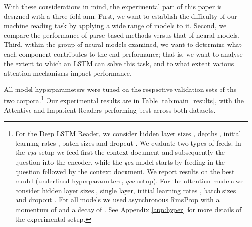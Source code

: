 \documentclass{article}
\begin{document}
With these considerations in mind, the experimental part of this paper is
designed with a three-fold aim. First, we want to establish the difficulty of our
machine reading task by applying a wide range of models to it. Second, we compare
the performance of parse-based methods versus that of neural models. Third,
within the group of neural models examined, we want to determine what each
component contributes to the end performance; that is, we want to analyse the
extent to which an LSTM can solve this task, and to what extent various
attention mechanisms impact performance.

\newcommand{\ee}[1][]{\text{\sc{e}#1}}

 All model hyperparameters were tuned on the respective validation sets of the
 two corpora.\footnote{For the Deep LSTM Reader, we consider hidden layer sizes
   , depths , initial
   learning rates , batch
   sizes  and dropout .  We
   evaluate two types of feeds. In the \textit{cqa} setup we feed first the
   context document and subsequently the question into the encoder, while the
   \textit{qca} model starts by feeding in the question followed by the context
   document. We report results on the best model (underlined hyperparameters,
   \textit{qca} setup).  For the attention models we consider hidden layer sizes
   , single layer,  initial learning rates
 , batch sizes  and dropout
 . For all models we used asynchronous RmsProp
 \cite{Tieleman:2012:RMSPROP} with a momentum of  and a decay of .
 See Appendix \ref{app:hyper} for more details of the experimental setup.}
Our experimental results are in Table \ref{tab:main_results}, with the
Attentive and Impatient Readers performing best across both datasets.
\end{document}
